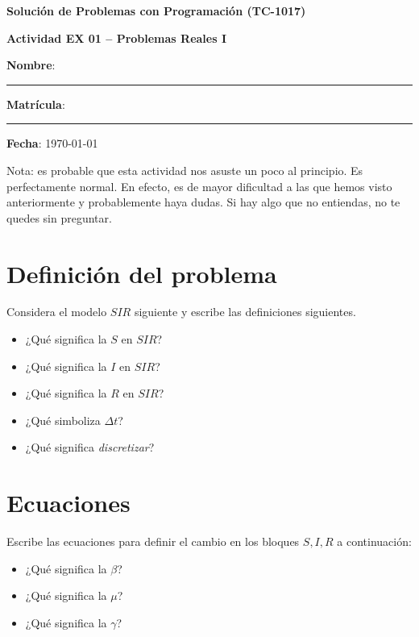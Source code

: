 \documentclass[spanish, 10pt]{article}
\begin{document}
\begin{center}
	{\Large \textbf{Solución de Problemas con Programación (TC-1017)}}
	
	\bigskip
	{\large \textbf{Actividad EX 01 -- Problemas Reales I}}
\end{center}

\bigskip
{\large \textbf{Nombre}: \rule{13.7 cm}{0.4mm}}



\bigskip
{\large \textbf{Matrícula}: \rule{5 cm}{0.4mm}} \hfill {\large \textbf{Fecha}: \today}

\bigskip

{\footnotesize Nota: es probable que esta actividad nos asuste un poco al principio. Es perfectamente normal.
En efecto, es de mayor dificultad a las que hemos visto anteriormente y probablemente haya dudas.
Si hay algo que no entiendas, no te quedes sin preguntar.}

\section{Definición del problema}

Considera el modelo $SIR$ siguiente y escribe las definiciones siguientes.

\begin{itemize}
    \item ¿Qué significa la $S$ en $SIR$?
    \item ¿Qué significa la $I$ en $SIR$?
    \item ¿Qué significa la $R$ en $SIR$?
    \item ¿Qué simboliza $\Delta t$?
    \item ¿Qué significa \textit{discretizar}?
\end{itemize}


\section{Ecuaciones}

Escribe las ecuaciones para definir el cambio en los bloques $S, I, R$ a continuación:

\vspace{2in}

\begin{itemize}
    \item ¿Qué significa la $\beta$?
    \item ¿Qué significa la $\mu$?
    \item ¿Qué significa la $\gamma$?
\end{itemize}
\end{document}
